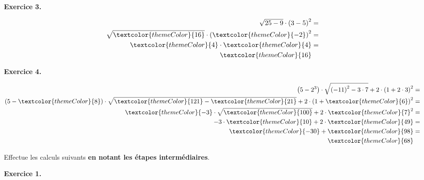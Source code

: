 \newpage
{\bfseries\color{themeColor}Exercice 3.} 

{\vspace{-30pt}\color{black}
\begin{align*}
\sqrt{25-9} \cdot \left(3-5\right)^2 &=\\
\sqrt{\textcolor{themeColor}{16}} \cdot \left(\textcolor{themeColor}{-2}\right)^2 &=\\
\textcolor{themeColor}{4} \cdot \textcolor{themeColor}{4} &=\\
\textcolor{themeColor}{16}
\end{align*}
}

\vspace{30pt}
{\bfseries\color{themeColor}Exercice 4.} 

{\vspace{-30pt}\color{black}
\begin{align*}
\left(5-2^3\right) \cdot \sqrt{\left(-11\right)^2 - 3 \cdot 7} + 2 \cdot \left(1 + 2 \cdot 3\right)^2&=\\
\left(5-\textcolor{themeColor}{8}\right) \cdot \sqrt{\textcolor{themeColor}{121} - \textcolor{themeColor}{21}} + 2 \cdot \left(1 + \textcolor{themeColor}{6}\right)^2&=\\
\textcolor{themeColor}{-3} \cdot \sqrt{\textcolor{themeColor}{100}} + 2 \cdot \textcolor{themeColor}{7}^2&=\\
-3 \cdot \textcolor{themeColor}{10} + 2 \cdot \textcolor{themeColor}{49}&=\\
\textcolor{themeColor}{-30} + \textcolor{themeColor}{98}&=\\
\textcolor{themeColor}{68}
\end{align*}
}

\newpage
{}

Effectue les calculs suivants \textbf{en notant les étapes intermédiaires}.

\vspace{30pt}
{\bfseries\color{themeColor}Exercice 1.} 

